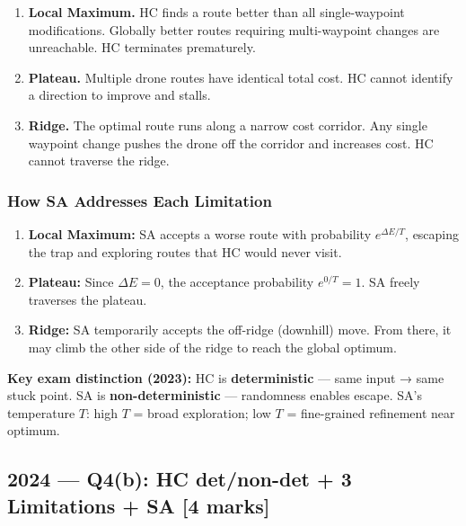 \documentclass[12pt, a4paper]{article}
\newenvironment{answerbox}{\begin{mdframed}[style=answerframe]}{\end{mdframed}}
\begin{document}
\begin{enumerate}[leftmargin=1.5cm, itemsep=5pt]
  \item \textbf{Local Maximum.} HC finds a route better than all single-waypoint modifications. Globally better routes requiring multi-waypoint changes are unreachable. HC terminates prematurely.

  \item \textbf{Plateau.} Multiple drone routes have identical total cost. HC cannot identify a direction to improve and stalls.

  \item \textbf{Ridge.} The optimal route runs along a narrow cost corridor. Any single waypoint change pushes the drone off the corridor and increases cost. HC cannot traverse the ridge.
\end{enumerate}

\subsubsection*{How SA Addresses Each Limitation}

\begin{enumerate}[leftmargin=1.5cm, itemsep=5pt]
  \item \textbf{Local Maximum:} SA accepts a worse route with probability $e^{\Delta E/T}$, escaping the trap and exploring routes that HC would never visit.

  \item \textbf{Plateau:} Since $\Delta E = 0$, the acceptance probability $e^{0/T} = 1$. SA freely traverses the plateau.

  \item \textbf{Ridge:} SA temporarily accepts the off-ridge (downhill) move. From there, it may climb the other side of the ridge to reach the global optimum.
\end{enumerate}

\begin{answerbox}
\textbf{Key exam distinction (2023):} HC is \textbf{deterministic} — same input → same stuck point. SA is \textbf{non-deterministic} — randomness enables escape. SA's temperature $T$: high $T$ = broad exploration; low $T$ = fine-grained refinement near optimum.
\end{answerbox}

\subsection{2024 — Q4(b): HC det/non-det + 3 Limitations + SA [4 marks]}
\end{document}
